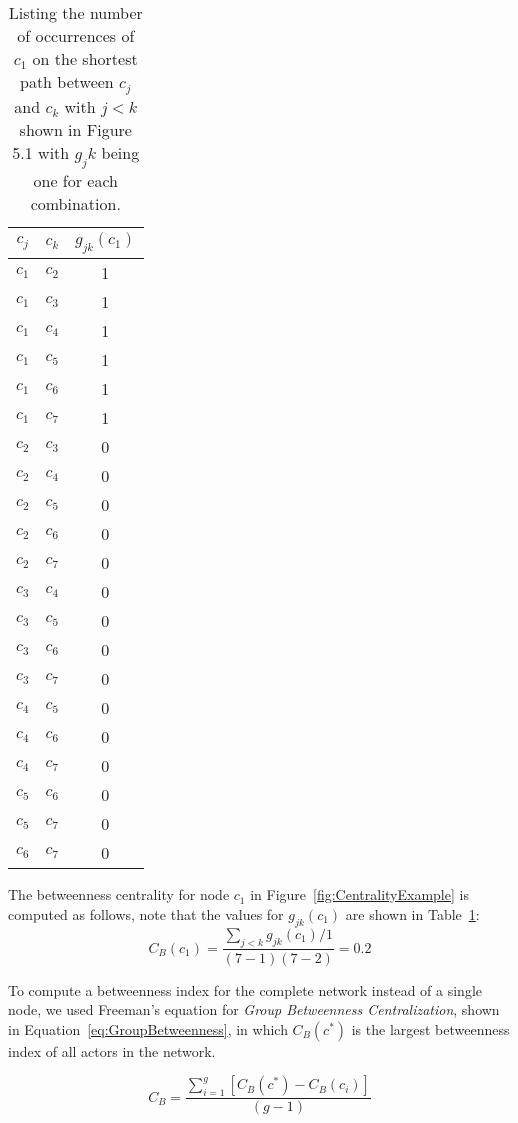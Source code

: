 \begin{table}[t]
\centering
\caption{Listing the number of occurrences of $c_1$ on the shortest path between $c_j$ and $c_k$ with $j<k$ shown in Figure 5.1 with $g_jk$ being one for each combination.}
\begin{tabular}{ccc}
\toprule
$c_j$ & $c_k$ & $g_{jk}(c_1)$\\
\midrule
$c_1$&$c_2$&1\\
$c_1$&$c_3$&1\\
$c_1$&$c_4$&1\\
$c_1$&$c_5$&1\\
$c_1$&$c_6$&1\\
$c_1$&$c_7$&1\\
$c_2$&$c_3$&0\\
$c_2$&$c_4$&0\\
$c_2$&$c_5$&0\\
$c_2$&$c_6$&0\\
$c_2$&$c_7$&0\\
$c_3$&$c_4$&0\\
$c_3$&$c_5$&0\\
$c_3$&$c_6$&0\\
$c_3$&$c_7$&0\\
$c_4$&$c_5$&0\\
$c_4$&$c_6$&0\\
$c_4$&$c_7$&0\\
$c_5$&$c_6$&0\\
$c_5$&$c_7$&0\\
$c_6$&$c_7$&0\\
\bottomrule
\end{tabular}
\label{tab:between}
\end{table}

The betweenness centrality for node $c_1$ in Figure~\ref{fig:CentralityExample} is computed as follows, note that the values for $g_{jk}(c_1)$ are shown in Table~\ref{tab:between}:
\begin{equation}
\displaystyle C_B(c_1) = \frac{\sum_{j<k} g_{jk}(c_1)/1}{(7-1)(7-2)} = 0.2
\end{equation}

To compute a betweenness index for the complete network instead of a single node,
we used Freeman's equation for \emph{Group Betweenness Centralization}, shown in Equation~\ref{eq:GroupBetweenness}, in which $C_B(c^*)$ is
the largest betweenness index of all actors in the network.

\begin{equation}
\displaystyle C_B =  \frac{\sum_{i=1}^g[C_B(c^*)-C_B(c_i)]}{(g-1)}
\label{eq:GroupBetweenness}
\end{equation}


